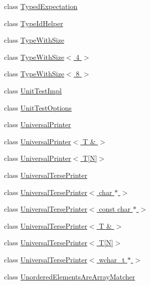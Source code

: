 \begin{DoxyCompactItemize}
class \hyperlink{classtesting_1_1internal_1_1TypedExpectation}{Typed\+Expectation}
\item 
class \hyperlink{classtesting_1_1internal_1_1TypeIdHelper}{Type\+Id\+Helper}
\item 
class \hyperlink{classtesting_1_1internal_1_1TypeWithSize}{Type\+With\+Size}
\item 
class \hyperlink{classtesting_1_1internal_1_1TypeWithSize_3_014_01_4}{Type\+With\+Size$<$ 4 $>$}
\item 
class \hyperlink{classtesting_1_1internal_1_1TypeWithSize_3_018_01_4}{Type\+With\+Size$<$ 8 $>$}
\item 
class \hyperlink{classtesting_1_1internal_1_1UnitTestImpl}{Unit\+Test\+Impl}
\item 
class \hyperlink{classtesting_1_1internal_1_1UnitTestOptions}{Unit\+Test\+Options}
\item 
class \hyperlink{classtesting_1_1internal_1_1UniversalPrinter}{Universal\+Printer}
\item 
class \hyperlink{classtesting_1_1internal_1_1UniversalPrinter_3_01T_01_6_01_4}{Universal\+Printer$<$ T \& $>$}
\item 
class \hyperlink{classtesting_1_1internal_1_1UniversalPrinter_3_01T[N]_4}{Universal\+Printer$<$ T\mbox{[}\+N\mbox{]}$>$}
\item 
class \hyperlink{classtesting_1_1internal_1_1UniversalTersePrinter}{Universal\+Terse\+Printer}
\item 
class \hyperlink{classtesting_1_1internal_1_1UniversalTersePrinter_3_01char_01_5_01_4}{Universal\+Terse\+Printer$<$ char $\ast$ $>$}
\item 
class \hyperlink{classtesting_1_1internal_1_1UniversalTersePrinter_3_01const_01char_01_5_01_4}{Universal\+Terse\+Printer$<$ const char $\ast$ $>$}
\item 
class \hyperlink{classtesting_1_1internal_1_1UniversalTersePrinter_3_01T_01_6_01_4}{Universal\+Terse\+Printer$<$ T \& $>$}
\item 
class \hyperlink{classtesting_1_1internal_1_1UniversalTersePrinter_3_01T[N]_4}{Universal\+Terse\+Printer$<$ T\mbox{[}\+N\mbox{]}$>$}
\item 
class \hyperlink{classtesting_1_1internal_1_1UniversalTersePrinter_3_01wchar__t_01_5_01_4}{Universal\+Terse\+Printer$<$ wchar\+\_\+t $\ast$ $>$}
\item 
class \hyperlink{classtesting_1_1internal_1_1UnorderedElementsAreArrayMatcher}{Unordered\+Elements\+Are\+Array\+Matcher}
\item 

\end{DoxyCompactItemize}
